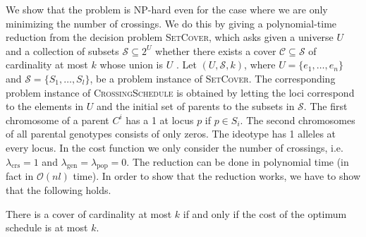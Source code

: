 \documentclass[runningheads]{llncs}
\newcommand{\BigOh}{\ensuremath{\mathcal{O}}}
\begin{document}
We show that the problem is NP-hard even for the case where we are only minimizing the number of crossings.
We do this by giving a polynomial-time reduction from the decision problem \textsc{SetCover}, which asks given a universe $U$ and a collection of subsets $\mathcal{S} \subseteq 2^U$ whether there exists a cover $\mathcal{C} \subseteq \mathcal{S}$ of cardinality at most $k$ whose union is $U$ \cite{Karp:1972}. Let $(U, \mathcal{S}, k)$, where $U = \{e_1, \ldots, e_n\}$ and $\mathcal{S} = \{S_1, \ldots, S_l\}$, be a problem instance of \textsc{SetCover}. The corresponding problem instance of \textsc{CrossingSchedule} is obtained by letting the loci correspond to the elements in $U$ and the initial set of parents to the subsets in $\mathcal{S}$. The first chromosome of a parent $C^i$ has a 1 at locus $p$ if $p \in S_i$. The second chromosomes of all parental genotypes consists of only zeros. The ideotype has 1 alleles at every locus. In the cost function we only consider the number of crossings, i.e.\ $\lambda_\mathrm{crs} = 1$ and $\lambda_\mathrm{gen} = \lambda_\mathrm{pop} = 0$. The reduction can be done in polynomial time (in fact in $\BigOh(nl)$ time). In order to show that the reduction works, we have to show that the following holds.
\begin{lemma}
\label{lem:NP-hardness}
There is a cover of cardinality at most $k$ if and only if the cost of the optimum schedule is at most $k$.
\end{lemma}
\end{document}
